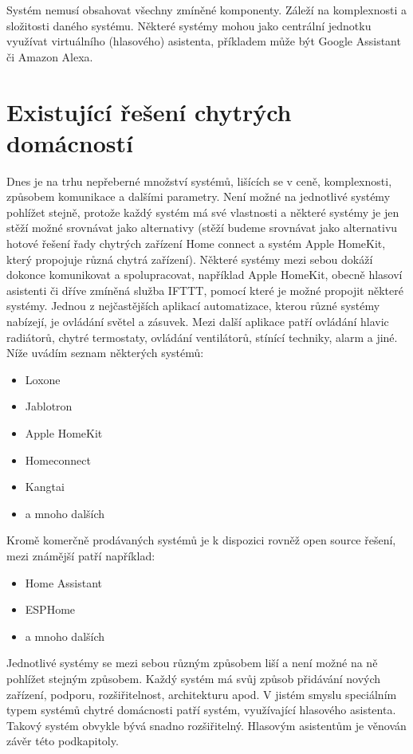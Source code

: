 Systém nemusí obsahovat všechny zmíněné komponenty. Záleží na komplexnosti a složitosti daného systému. Některé systémy mohou jako centrální jednotku využívat virtuálního (hlasového) asistenta, příkladem může být Google Assistant či Amazon Alexa.

\section{Existující řešení chytrých domácností}
Dnes je na trhu nepřeberné množství systémů, lišících se v ceně, komplexnosti, způsobem komunikace a dalšími parametry. Není možné na jednotlivé systémy pohlížet stejně, protože každý systém má své vlastnosti a některé systémy je jen stěží možné srovnávat jako alternativy (stěží budeme srovnávat jako alternativu hotové řešení řady chytrých zařízení Home connect a systém Apple HomeKit, který propojuje různá chytrá zařízení). Některé systémy mezi sebou dokáží dokonce komunikovat a spolupracovat, například Apple HomeKit, obecně hlasoví asistenti či dříve zmíněná služba IFTTT, pomocí které je možné propojit některé systémy.
Jednou z nejčastějších aplikací automatizace, kterou různé systémy nabízejí, je ovládání světel a zásuvek. Mezi další aplikace patří ovládání hlavic radiátorů, chytré termostaty, ovládání ventilátorů, stínící techniky, alarm a jiné. Níže uvádím seznam některých systémů:
\begin{itemize}
\item Loxone
\item Jablotron
\item Apple HomeKit
\item Homeconnect
\item Kangtai 
\item a mnoho dalších
\end{itemize}
Kromě komerčně prodávaných systémů je k dispozici rovněž open source řešení, mezi známější patří například:
\begin{itemize}
\item Home Assistant
\item ESPHome
\item a mnoho dalších
\end{itemize}

Jednotlivé systémy se mezi sebou různým způsobem liší a není možné na ně pohlížet stejným způsobem. Každý systém má svůj způsob přidávání  nových zařízení, podporu, rozšiřitelnost, architekturu apod. V jistém smyslu speciálním typem systémů chytré domácnosti patří systém, využívající hlasového asistenta. Takový systém obvykle bývá snadno rozšiřitelný. Hlasovým asistentům je věnován závěr této podkapitoly.

